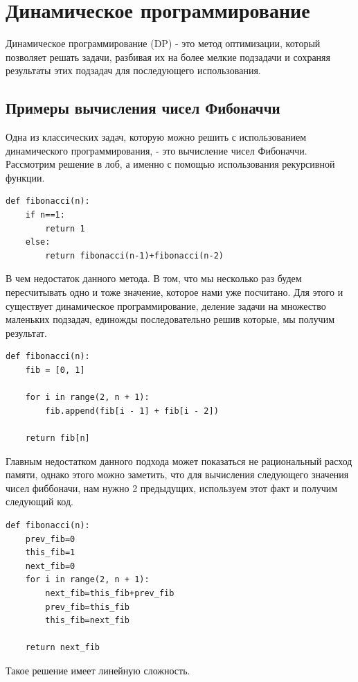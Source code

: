         
        
\newpage
\section{Динамическое программирование}
    Динамическое программирование (DP) - это метод оптимизации, который позволяет решать задачи, разбивая их на более мелкие подзадачи и сохраняя результаты этих подзадач для последующего использования.
    
    \subsection{Примеры вычисления чисел Фибоначчи}
        Одна из классических задач, которую можно решить с использованием динамического программирования, - это вычисление чисел Фибоначчи. 
        Рассмотрим решение в лоб, а именно с помощью использования рекурсивной функции.
        \begin{lstlisting}[label=def-fibonacci-null-example,caption=Первый пример  вычисления чисел Фибоначчи рекурсией]
def fibonacci(n):
    if n==1:
        return 1
    else:
        return fibonacci(n-1)+fibonacci(n-2)
        \end{lstlisting}
        В чем недостаток данного метода. В том, что мы несколько раз будем пересчитывать одно и тоже значение, которое нами уже посчитано. Для этого и существует динамическое программирование, деление задачи на множество маленьких подзадач, единожды последовательно решив которые, мы получим результат. 
       \begin{lstlisting}[label=def-fibonacci-first-example,caption=Второй пример  вычисления чисел Фибоначчи Динамическим программированием]
def fibonacci(n):
    fib = [0, 1]

    for i in range(2, n + 1):
        fib.append(fib[i - 1] + fib[i - 2])

    return fib[n]
        \end{lstlisting}
    Главным недостатком данного подхода может показаться не рациональный расход памяти, однако этого можно заметить, что для вычисления следующего значения чисел фиббоначи, нам нужно 2 предыдущих, используем этот факт и получим следующий код.
    \begin{lstlisting}[label=def-update-fibonacci,caption=Примеры вычисления чисел Фибоначчи Динамическим программированием-2]
def fibonacci(n):
    prev_fib=0
    this_fib=1
    next_fib=0
    for i in range(2, n + 1):
        next_fib=this_fib+prev_fib
        prev_fib=this_fib
        this_fib=next_fib

    return next_fib
        \end{lstlisting}
        Такое решение имеет линейную сложность.
